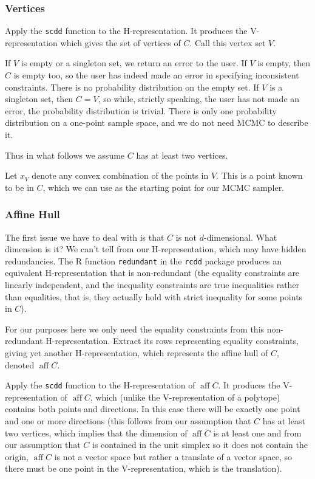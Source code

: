 \documentclass[11pt]{article}
\DeclareMathOperator{\aff}{aff}
\begin{document}
\subsubsection{Vertices}

Apply the \texttt{scdd} function to the H-representation.
It produces the V-representation which gives the set of vertices of $C$.
Call this vertex set $V$.

If $V$ is empty or a singleton set, we return an error to the user.
If $V$ is empty, then $C$ is empty too, so the user has indeed made an
error in specifying inconsistent constraints.  There is no probability
distribution on the empty set.
If $V$ is a singleton set, then $C = V$, so while, strictly speaking,
the user has not made an error, the probability distribution is trivial.
There is only one probability distribution on a one-point sample space,
and we do not need MCMC to describe it.

Thus in what follows we assume $C$ has at least two vertices.

Let $x_V$ denote any convex combination of the points in $V$.
This is a point known to be in $C$, which we can use as the starting
point for our MCMC sampler.

\subsubsection{Affine Hull}

The first issue we have to deal with is that $C$ is not $d$-dimensional.
What dimension is it?  We can't tell from our H-representation, which may
have hidden redundancies.  The R function \texttt{redundant}
in the \texttt{rcdd} package produces an equivalent H-representation that
is non-redundant (the equality constraints are linearly independent,
and the inequality constraints are true inequalities rather than equalities,
that is, they actually hold with strict inequality for some points in $C$).

For our purposes here we only need the equality constraints from
this non-redundant H-representation.  Extract its rows
representing equality constraints, giving yet another H-representation,
which represents the affine hull of $C$, denoted $\aff C$.

Apply the \texttt{scdd} function to the H-representation of $\aff C$.
It produces the V-representation of $\aff C$, which (unlike the
V-representation of a polytope) contains both points and directions.
In this case there will be exactly one point and one or more directions
(this follows from our assumption that $C$ has at least two vertices,
which implies that the dimension of $\aff C$ is at least one and from
our assumption that $C$ is contained in the unit simplex so it does
not contain the origin, $\aff C$ is not a vector space but rather a
translate of a vector space, so there must be one point in the
V-representation, which is the translation).
\end{document}
